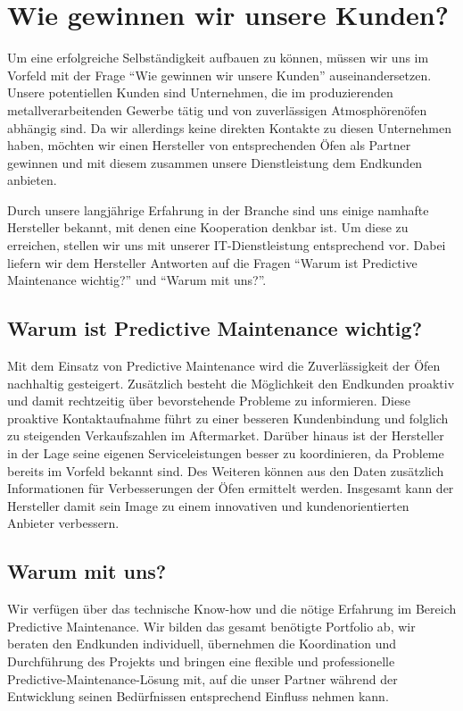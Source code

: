 \newpage
\section{Wie gewinnen wir unsere Kunden?}
Um eine erfolgreiche Selbständigkeit aufbauen zu können, müssen wir uns im Vorfeld mit der Frage “Wie gewinnen wir unsere Kunden” auseinandersetzen.
Unsere potentiellen Kunden sind Unternehmen, die im produzierenden metallverarbeitenden Gewerbe tätig und von zuverlässigen Atmosphörenöfen abhängig sind. Da wir allerdings keine direkten Kontakte zu diesen Unternehmen haben, möchten wir einen Hersteller von entsprechenden Öfen als Partner gewinnen und mit diesem zusammen unsere Dienstleistung dem Endkunden anbieten.

Durch unsere langjährige Erfahrung in der Branche sind uns einige namhafte Hersteller bekannt, mit denen eine Kooperation denkbar ist. Um diese zu erreichen, stellen wir uns mit unserer IT-Dienstleistung entsprechend vor. Dabei liefern wir dem Hersteller Antworten auf die Fragen “Warum ist Predictive Maintenance wichtig?” und “Warum mit uns?”.

\subsection{Warum ist Predictive Maintenance wichtig?}
Mit dem Einsatz von Predictive Maintenance wird die Zuverlässigkeit der Öfen nachhaltig gesteigert. Zusätzlich besteht die Möglichkeit den Endkunden proaktiv und damit rechtzeitig über bevorstehende Probleme zu informieren. Diese proaktive Kontaktaufnahme führt zu einer besseren Kundenbindung und folglich zu steigenden Verkaufszahlen im Aftermarket. Darüber hinaus ist der Hersteller in der Lage seine eigenen Serviceleistungen besser zu koordinieren, da Probleme bereits im Vorfeld bekannt sind. Des Weiteren können aus den Daten zusätzlich Informationen für Verbesserungen der Öfen ermittelt werden.
Insgesamt kann der Hersteller damit sein Image zu einem innovativen und kundenorientierten Anbieter verbessern.

\subsection{Warum mit uns?}
Wir verfügen über das technische Know-how und die nötige Erfahrung im Bereich Predictive Maintenance. Wir bilden das gesamt benötigte Portfolio ab, wir beraten den Endkunden individuell, übernehmen die Koordination und Durchführung des Projekts und bringen eine flexible und professionelle Predictive-Maintenance-Lösung mit, auf die unser Partner während der Entwicklung seinen Bedürfnissen entsprechend Einfluss nehmen kann. 


